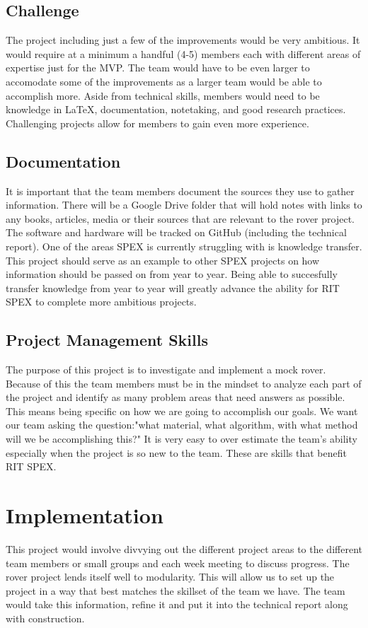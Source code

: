 \documentclass[conference]{IEEEtran} %
\begin{document}
\subsection{Challenge}
\label{subsec:challenge}
The project including just a few of the improvements would be very ambitious. 
It would require at a minimum a handful (4-5) members each with different areas of expertise just for the MVP.
The team would have to be even larger to accomodate some of the improvements as a larger team would be able to accomplish more. 
Aside from technical skills, members would need to be knowledge in \LaTeX{}, documentation, notetaking, and good research practices. 
Challenging projects allow for members to gain even more experience. 

\subsection{Documentation}
\label{subsec:docs}
It is important that the team members document the sources they use to gather information. 
There will be a Google Drive folder that will hold notes with links to any books, articles, media or their sources that are relevant to the rover project. 
The software and hardware will be tracked on GitHub (including the technical report).
One of the areas SPEX is currently struggling with is knowledge transfer.
This project should serve as an example to other SPEX projects on how information should be passed on from year to year.
Being able to succesfully transfer knowledge from year to year will greatly advance the ability for RIT SPEX to complete more ambitious projects.

\subsection{Project Management Skills}
\label{subsec:project-management}
The purpose of this project is to investigate and implement a mock rover.
Because of this the team members must be in the mindset to analyze each part of the project and identify as many problem areas that need answers as possible. 
This means being specific on how we are going to accomplish our goals.
We want our team asking the question:"what material, what algorithm, with what method will we be accomplishing this?"
It is very easy to over estimate the team's ability especially when the project is so new to the team.
These are skills that benefit RIT SPEX. 

\section{Implementation}
\label{sec:implementation}
This project would involve divvying out the different project areas to the different team members or small groups and each week meeting to discuss progress.
The rover project lends itself well to modularity.
This will allow us to set up the project in a way that best matches the skillset of the team we have. 
The team would take this information, refine it and put it into the technical report along with construction. 
\end{document}
